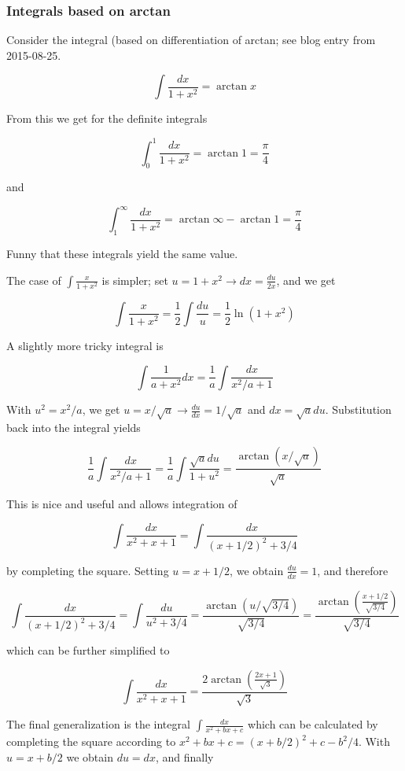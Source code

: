 

\subsubsection{Integrals based on arctan}

Consider the integral (based on differentiation of arctan; see blog entry from 2015-08-25.


\[\int \frac{dx}{1+x^2} = \arctan x\]

From this we get for the definite integrals

\[ \int_0^1 \frac{dx}{1+x^2} = \arctan 1 = \frac{\pi}{4}\]

and

\[ \int_1^\infty \frac{dx}{1+x^2} = \arctan \infty - \arctan 1 = \frac{\pi}{4}\]

Funny that these integrals yield the same value.

The case of $\int\frac{x}{1+x^2}$ is simpler; set $u=1+x^2 \rightarrow dx = \frac{du}{2x}$, and we get

\[\int\frac{x}{1+x^2} = \frac{1}{2} \int \frac{du}{u} = \frac{1}{2} \ln(1+x^2)\]

A slightly more tricky integral is

\[\int \frac{1}{a+x^2} dx = \frac{1}{a} \int \frac{dx}{x^2/a+1}\]

With $u^2 = x^2/a$, we get $u = x / \sqrt{a} \rightarrow \frac{du}{dx} = 1 / \sqrt{a}$ and $dx = \sqrt{a} du$. Substitution back into the integral yields

\[ \frac{1}{a} \int \frac{dx}{x^2/a+1} = \frac{1}{a} \int \frac{\sqrt{a} du}{1+u^2} = \frac{\arctan (x/\sqrt{a})}{\sqrt{a}}\]

This is nice and useful and allows integration of

\[\int \frac{dx}{x^2+x+1} = \int \frac{dx}{(x+1/2)^2 + 3/4} \]

by completing the square. Setting $u = x+1/2$, we obtain $\frac{du}{dx} = 1$, and therefore

\[\int \frac{dx}{(x+1/2)^2 + 3/4} = \int \frac{du}{u^2 + 3/4} = \frac{\arctan (u/\sqrt{3/4})}{\sqrt{3/4}} = \frac{\arctan \left( \frac{x+1/2}{\sqrt{3/4}} \right)}{\sqrt{3/4}}\]

which can be further simplified to

\[ \int \frac{dx}{x^2+x+1} = \frac{2 \arctan \left( \frac{2x+1}{\sqrt{3}} \right)}{\sqrt{3}} \]

The final generalization is the integral $\int\frac{dx}{x^2+bx+c}$ which can be calculated by completing the square according to
$x^2+bx+c = (x+b/2)^2 + c - b^2/4$. With $u=x+b/2$ we
obtain $du=dx$, and finally

